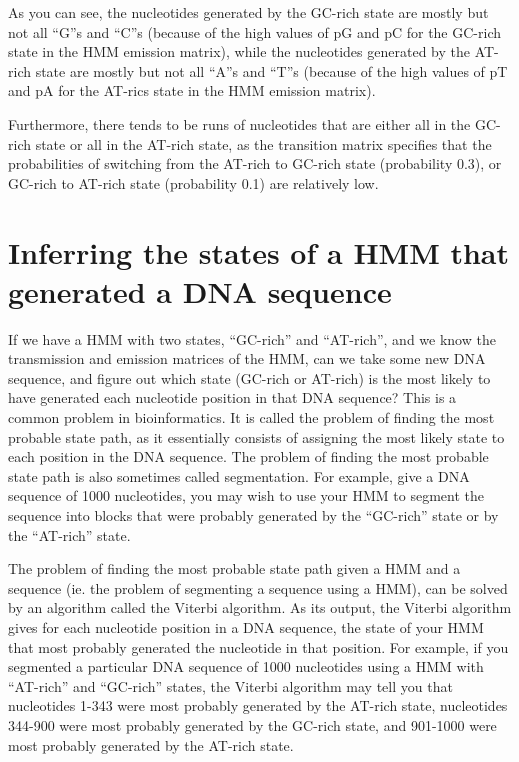 \documentclass[
]{book}
\begin{document}
As you can see, the nucleotides generated by the GC-rich state are mostly but not all ``G''s and ``C''s (because of the high values of pG and pC for the GC-rich state in the HMM emission matrix), while the nucleotides generated by the AT-rich state are mostly but not all ``A''s and ``T''s (because of the high values of pT and pA for the AT-rics state in the HMM emission matrix).

Furthermore, there tends to be runs of nucleotides that are either all in the GC-rich state or all in the AT-rich state, as the transition matrix specifies that the probabilities of switching from the AT-rich to GC-rich state (probability 0.3), or GC-rich to AT-rich state (probability 0.1) are relatively low.

\hypertarget{inferring-the-states-of-a-hmm-that-generated-a-dna-sequence}{%
\section{Inferring the states of a HMM that generated a DNA sequence}\label{inferring-the-states-of-a-hmm-that-generated-a-dna-sequence}}

If we have a HMM with two states, ``GC-rich'' and ``AT-rich'', and we know the transmission and emission matrices of the HMM, can we take some new DNA sequence, and figure out which state (GC-rich or AT-rich) is the most likely to have generated each nucleotide position in that DNA sequence? This is a common problem in bioinformatics. It is called the problem of finding the most probable state path, as it essentially consists of assigning the most likely state to each position in the DNA sequence. The problem of finding the most probable state path is also sometimes called segmentation. For example, give a DNA sequence of 1000 nucleotides, you may wish to use your HMM to segment the sequence into blocks that were probably generated by the ``GC-rich'' state or by the ``AT-rich'' state.

The problem of finding the most probable state path given a HMM and a sequence (ie. the problem of segmenting a sequence using a HMM), can be solved by an algorithm called the Viterbi algorithm. As its output, the Viterbi algorithm gives for each nucleotide position in a DNA sequence, the state of your HMM that most probably generated the nucleotide in that position. For example, if you segmented a particular DNA sequence of 1000 nucleotides using a HMM with ``AT-rich'' and ``GC-rich'' states, the Viterbi algorithm may tell you that nucleotides 1-343 were most probably generated by the AT-rich state, nucleotides 344-900 were most probably generated by the GC-rich state, and 901-1000 were most probably generated by the AT-rich state.
\end{document}
